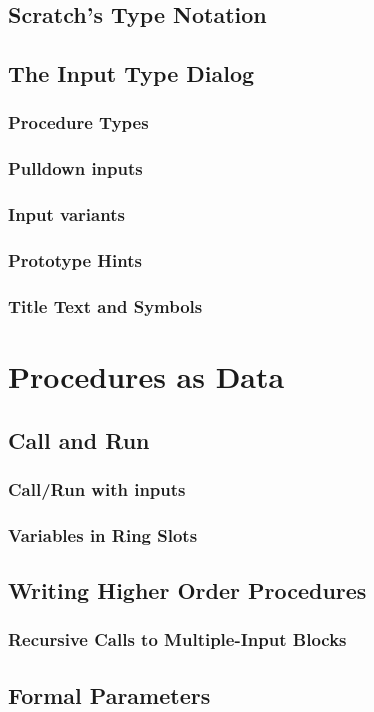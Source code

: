 \documentclass{report}
\begin{document}
\section{Scratch's Type Notation}
\section{The \Snap{} Input Type Dialog}
\subsection{Procedure Types}
\subsection{Pulldown inputs}
\subsection{Input variants}
\subsection{Prototype Hints}
\subsection{Title Text and Symbols}
\chapter{Procedures as Data}
\section{Call and Run}
\subsection{Call/Run with inputs}
\subsection{Variables in Ring Slots}
\section{Writing Higher Order Procedures}
\subsection{Recursive Calls to Multiple-Input Blocks}
\section{Formal Parameters}
\end{document}

